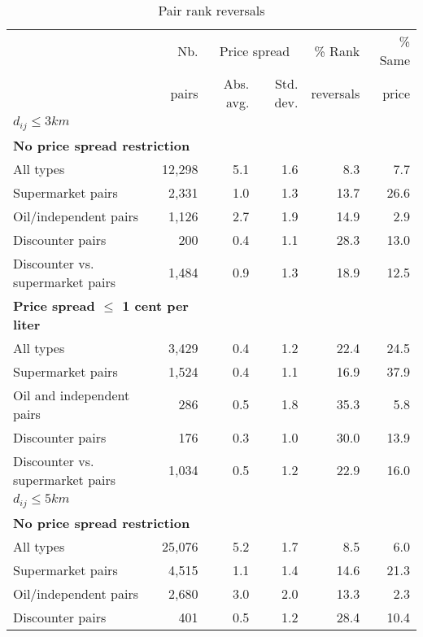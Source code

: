 \documentclass[english]{article}
\begin{document}
\begin{table}[H]
\begin{threeparttable}
\renewcommand{\arraystretch}{0.8} %
\caption{Pair rank reversals}
\label{tab:stats_pair_rank_reversals}
\begin{tabular}{lrrrrr}
\hline
\hline
      & Nb.   & \multicolumn{2}{c}{Price spread} & \% Rank   & \% Same\\
      & pairs & Abs. avg.  & Std. dev.           & reversals & price \\
\hline
\textbf{$d_{ij} \le  3 km$} &       &       &       &       &  \\
\hline
\multicolumn{2}{l}{\textbf{No price spread restriction}}  &       &       &       &  \\
All types & 12,298 & 5.1   & 1.6   & 8.3   & 7.7 \\
Supermarket pairs & 2,331 & 1.0   & 1.3   & 13.7  & 26.6 \\
Oil/independent pairs & 1,126 & 2.7   & 1.9   & 14.9  & 2.9 \\
Discounter pairs & 200   & 0.4   & 1.1   & 28.3  & 13.0 \\
Discounter vs. supermarket pairs & 1,484 & 0.9   & 1.3   & 18.9  & 12.5 \\
\hline
\multicolumn{2}{l}{\textbf{Price spread $\le$ 1 cent per liter}}   &       &       &       &  \\
All types & 3,429 & 0.4   & 1.2   & 22.4  & 24.5 \\
Supermarket pairs & 1,524 & 0.4   & 1.1   & 16.9  & 37.9 \\
Oil and independent pairs & 286   & 0.5   & 1.8   & 35.3  & 5.8 \\
Discounter pairs & 176   & 0.3   & 1.0   & 30.0  & 13.9 \\
Discounter vs. supermarket pairs & 1,034 & 0.5   & 1.2   & 22.9  & 16.0 \\
\hline
\textbf{$d_{ij} \le  5 km$} &       &       &       &       &  \\
\hline
\multicolumn{2}{l}{\textbf{No price spread restriction}}   &       &       &       &  \\
All types & 25,076 & 5.2   & 1.7   & 8.5   & 6.0 \\
Supermarket pairs & 4,515 & 1.1   & 1.4   & 14.6  & 21.3 \\
Oil/independent pairs & 2,680 & 3.0   & 2.0   & 13.3  & 2.3 \\
Discounter pairs & 401   & 0.5   & 1.2   & 28.4  & 10.4 \\

\end{tabular}
\end{threeparttable}
\end{table}
\end{document}
